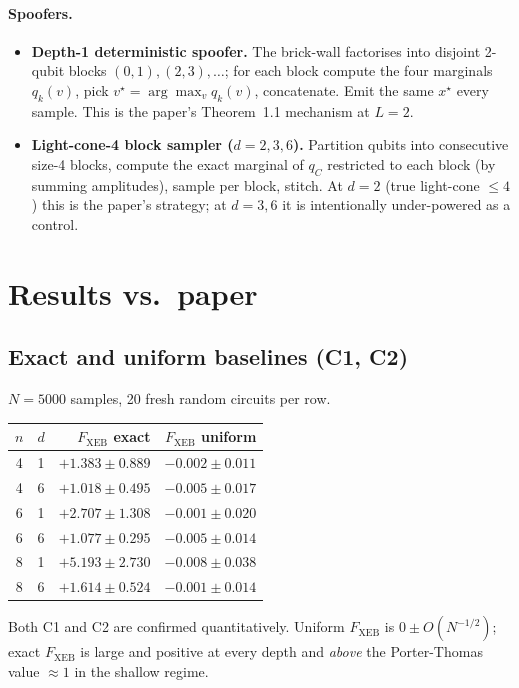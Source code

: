 \documentclass[11pt]{article}
\begin{document}
\paragraph{Spoofers.}
\begin{itemize}
\item \textbf{Depth-1 deterministic spoofer.} The brick-wall factorises
  into disjoint 2-qubit blocks $(0,1),(2,3),\ldots$; for each block
  compute the four marginals $q_k(v)$, pick $v^\star = \arg\max_v q_k(v)$,
  concatenate. Emit the same $x^\star$ every sample. This is the
  paper's Theorem~1.1 mechanism at $L{=}2$.
\item \textbf{Light-cone-4 block sampler ($d=2,3,6$).} Partition qubits
  into consecutive size-4 blocks, compute the exact marginal of $q_C$
  restricted to each block (by summing amplitudes), sample per block,
  stitch. At $d=2$ (true light-cone $\le 4$) this is the paper's
  strategy; at $d=3,6$ it is intentionally under-powered as a control.
\end{itemize}

\section{Results vs.\ paper}

\subsection{Exact and uniform baselines (C1, C2)}
$N=5000$ samples, 20 fresh random circuits per row.

\begin{center}\small
\begin{tabular}{ccrr}
\toprule
$n$ & $d$ & $F_{\mathrm{XEB}}$ exact & $F_{\mathrm{XEB}}$ uniform \\
\midrule
4 & 1 & $+1.383\pm 0.889$ & $-0.002\pm 0.011$ \\
4 & 6 & $+1.018\pm 0.495$ & $-0.005\pm 0.017$ \\
6 & 1 & $+2.707\pm 1.308$ & $-0.001\pm 0.020$ \\
6 & 6 & $+1.077\pm 0.295$ & $-0.005\pm 0.014$ \\
8 & 1 & $+5.193\pm 2.730$ & $-0.008\pm 0.038$ \\
8 & 6 & $+1.614\pm 0.524$ & $-0.001\pm 0.014$ \\
\bottomrule
\end{tabular}
\end{center}

Both C1 and C2 are confirmed quantitatively. Uniform $F_{\mathrm{XEB}}$
is $0\pm O(N^{-1/2})$; exact $F_{\mathrm{XEB}}$ is large and positive at
every depth and \emph{above} the Porter-Thomas value $\approx 1$ in the
shallow regime.
\end{document}
